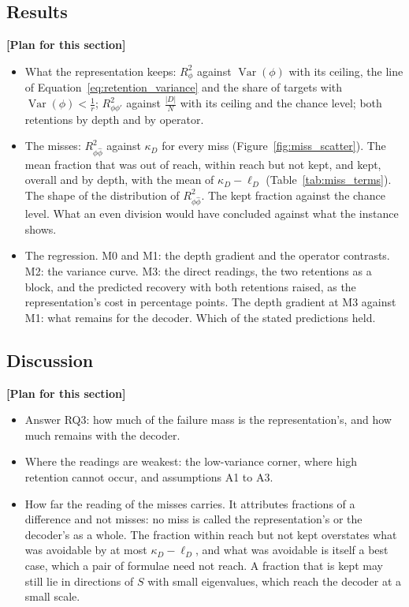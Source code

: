 \documentclass[titlepage,a4paper,11pt]{report}
\newenvironment{RSplan}{\par\medskip\color{orange!85!black}\noindent\textbf{[Plan for this section]}\par}{\par\medskip}
\begin{document}
    \subsection{Results}\label{sec:diag_results}
    \begin{RSplan}
    \begin{itemize}
        \item What the representation keeps: $R^2_\phi$ against $\operatorname{Var}(\phi)$ with its ceiling, the line of Equation~\eqref{eq:retention_variance} and the share of targets with $\operatorname{Var}(\phi)<\frac1r$; $R^2_{\phi\phi'}$ against $\frac{|D|}{N}$ with its ceiling and the chance level; both retentions by depth and by operator.
        \item The misses: $R^2_{\phi\hat\phi}$ against $\kappa_D$ for every miss (Figure~\ref{fig:miss_scatter}). The mean fraction that was out of reach, within reach but not kept, and kept, overall and by depth, with the mean of $\kappa_D-\ell_D$ (Table~\ref{tab:miss_terms}). The shape of the distribution of $R^2_{\phi\hat\phi}$. The kept fraction against the chance level. What an even division would have concluded against what the instance shows.
        \item The regression. M0 and M1: the depth gradient and the operator contrasts. M2: the variance curve. M3: the direct readings, the two retentions as a block, and the predicted recovery with both retentions raised, as the representation's cost in percentage points. The depth gradient at M3 against M1: what remains for the decoder. Which of the stated predictions held.
    \end{itemize}
    \end{RSplan}

    \subsection{Discussion}\label{sec:diag_discussion}
    \begin{RSplan}
    \begin{itemize}
        \item Answer RQ3: how much of the failure mass is the representation's, and how much remains with the decoder.
        \item Where the readings are weakest: the low-variance corner, where high retention cannot occur, and assumptions A1 to A3.
        \item How far the reading of the misses carries. It attributes fractions of a difference and not misses: no miss is called the representation's or the decoder's as a whole. The fraction within reach but not kept overstates what was avoidable by at most $\kappa_D-\ell_D$, and what was avoidable is itself a best case, which a pair of formulae need not reach. A fraction that is kept may still lie in directions of $S$ with small eigenvalues, which reach the decoder at a small scale.
    \end{itemize}
    \end{RSplan}
\end{document}
